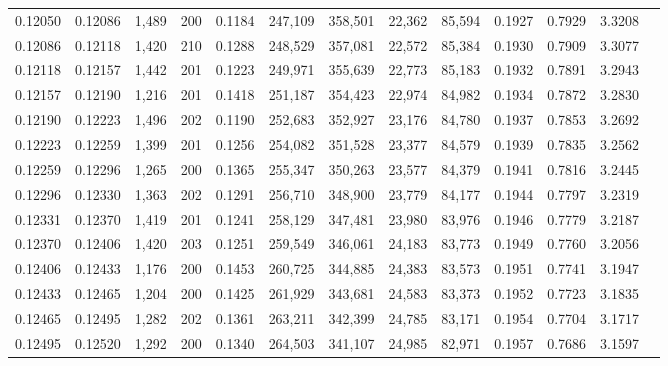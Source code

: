 \begin{tabular}{rrrrrrrrrrrrr}
0.12050 & 0.12086 & 1,489 & 200 &                                     0.1184 & 247,109 & 358,501 &  22,362 &  85,594 & 0.1927 & 0.7929 & 3.3208 \\
0.12086 & 0.12118 & 1,420 & 210 &                                     0.1288 & 248,529 & 357,081 &  22,572 &  85,384 & 0.1930 & 0.7909 & 3.3077 \\
0.12118 & 0.12157 & 1,442 & 201 &                                     0.1223 & 249,971 & 355,639 &  22,773 &  85,183 & 0.1932 & 0.7891 & 3.2943 \\
0.12157 & 0.12190 & 1,216 & 201 &                                     0.1418 & 251,187 & 354,423 &  22,974 &  84,982 & 0.1934 & 0.7872 & 3.2830 \\
0.12190 & 0.12223 & 1,496 & 202 &                                     0.1190 & 252,683 & 352,927 &  23,176 &  84,780 & 0.1937 & 0.7853 & 3.2692 \\
0.12223 & 0.12259 & 1,399 & 201 &                                     0.1256 & 254,082 & 351,528 &  23,377 &  84,579 & 0.1939 & 0.7835 & 3.2562 \\
0.12259 & 0.12296 & 1,265 & 200 &                                     0.1365 & 255,347 & 350,263 &  23,577 &  84,379 & 0.1941 & 0.7816 & 3.2445 \\
0.12296 & 0.12330 & 1,363 & 202 &                                     0.1291 & 256,710 & 348,900 &  23,779 &  84,177 & 0.1944 & 0.7797 & 3.2319 \\
0.12331 & 0.12370 & 1,419 & 201 &                                     0.1241 & 258,129 & 347,481 &  23,980 &  83,976 & 0.1946 & 0.7779 & 3.2187 \\
0.12370 & 0.12406 & 1,420 & 203 &                                     0.1251 & 259,549 & 346,061 &  24,183 &  83,773 & 0.1949 & 0.7760 & 3.2056 \\
0.12406 & 0.12433 & 1,176 & 200 &                                     0.1453 & 260,725 & 344,885 &  24,383 &  83,573 & 0.1951 & 0.7741 & 3.1947 \\
0.12433 & 0.12465 & 1,204 & 200 &                                     0.1425 & 261,929 & 343,681 &  24,583 &  83,373 & 0.1952 & 0.7723 & 3.1835 \\
0.12465 & 0.12495 & 1,282 & 202 &                                     0.1361 & 263,211 & 342,399 &  24,785 &  83,171 & 0.1954 & 0.7704 & 3.1717 \\
0.12495 & 0.12520 & 1,292 & 200 &                                     0.1340 & 264,503 & 341,107 &  24,985 &  82,971 & 0.1957 & 0.7686 & 3.1597 \\

\end{tabular}
